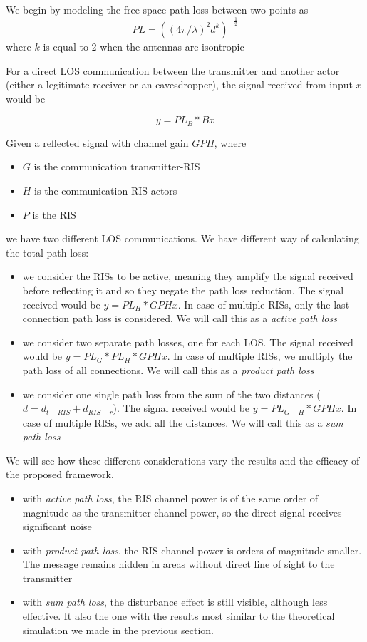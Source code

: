 We begin by modeling the free space path loss \cite{Free_space_path_loss} between two points as
\begin{equation}
  PL = ((4 \pi / \lambda)^2 d^k)^{-\frac{1}{2}}
\end{equation}
where $k$ is equal to $2$ when the antennas are isontropic %

For a direct LOS communication between the transmitter and another actor (either a legitimate receiver or an eavesdropper), the signal received from input $x$ would be

\begin{equation}
  y = PL_B * Bx
\end{equation}

Given a reflected signal with channel gain $GPH$, where
\begin{itemize}
  \item $G$ is the communication transmitter-RIS
  \item $H$ is the communication RIS-actors
  \item $P$ is the RIS %
\end{itemize}
we have two different LOS communications. We have different way of calculating the total path loss:
\begin{itemize}
  \item we consider the RISs to be active, meaning they amplify the signal received before reflecting it and so they negate the path loss reduction. The signal received would be $y = PL_H * GPHx$. In case of multiple RISs, only the last connection path loss is considered. We will call this as a \textit{active path loss}
  \item we consider two separate path losses, one for each LOS. The signal received would be $y = PL_G * PL_H * GPHx$. In case of multiple RISs, we multiply the path loss of all connections. We will call this as a \textit{product path loss}
  \item we consider one single path loss from the sum of the two distances ($d = d_{t-RIS} + d_{RIS-r}$). The signal received would be $y = PL_{G+H} * GPHx$. In case of multiple RISs, we add all the distances. We will call this as a \textit{sum path loss}
\end{itemize}

We will see how these different considerations vary the results and the efficacy of the proposed framework.
\begin{itemize}
  \item with \textit{active path loss}, the RIS channel power is of the same order of magnitude as the transmitter channel power, so the direct signal receives significant noise
  \item with \textit{product path loss}, the RIS channel power is orders of magnitude smaller. The message remains hidden in areas without direct line of sight to the transmitter
  \item with \textit{sum path loss}, the disturbance effect is still visible, although less effective. It also the one with the results most similar to the theoretical simulation we made in the previous section.
\end{itemize}

